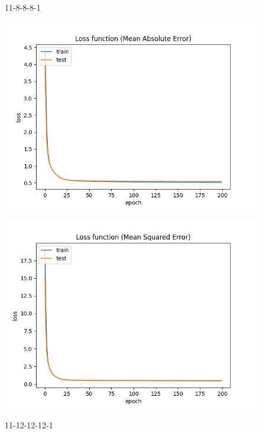 \begin{figure}[!htb]
\begin{minipage}{0.5\textwidth}
        \label{fig:11-8-8-8-1.1.2}
    \end{minipage}
    \caption{11-8-8-8-1}
\end{figure}

\begin{figure}[!htb]
    \begin{minipage}{0.5\textwidth}
        \centering
        \includegraphics[width=01\textwidth]{../images/11-12-12-12/Loss function(Mean Absolute Error).png}
        \label{fig:11-12-12-12-1.1}
    \end{minipage}\hfill
    \begin{minipage}{0.5\textwidth}
        \centering
        \includegraphics[width=01\textwidth]{../images/11-12-12-12/Loss function(Mean Squared Error).png}
        \label{fig:11-12-12-12-1.1.2}
    \end{minipage}
    \caption{11-12-12-12-1}
\end{figure}

